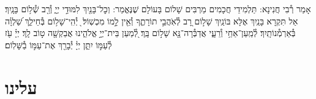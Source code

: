 \documentclass[twoside, openany, parskip=half, 11pt]{book}
\begin{document}
\vspace{-.3\baselineskip}
אָמַר רְ֯בִי חֲנִינָא: תַּלְמִידֵי חֲכָמִים מַרְבִּים שָׁלוֹם בָּעוֹלָם שֶׁנֶּאֱמַר: וְכׇל־בָּנַ֖יִךְ לִמּוּדֵ֣י יְיָ֑ וְ֯רַ֖ב שְׁ֯ל֥וֹם בָּנָֽיִךְ׃ אַל תִּקְרָא בָּנַֽיִךְ אֶלָּא בּוֹנַֽיִךְ שָׁל֣וֹם רָ֭ב לְ֯אֹֽהֲבֵ֣י תוֹרָתֶ֑ךָ וְ֯אֵ֖ין לָ֣מוֹ מִכְשֽׁוֹל׃  ֖ יְ֯הִֽי־שָׁל֥וֹם בְּ֯חֵילֵ֑ךְ שַׁ֝לְוָ֗ה בְּ֯אַרְמְ֯נוֹתָֽיִךְ׃ לְ֯מַֽעַן־אַחַ֥י וְ֯רֵעָ֑י אֲדַבְּ֯רָה־נָּ֖א שָׁל֣וֹם בָּֽךְ׃ לְ֭֯מַעַן בֵּית־יְיָ֣ אֱלֹהֵ֑ינוּ אֲבַקְשָׁ֖ה ט֣וֹב לָֽךְ׃ יְיָ֗ עֹ֖ז לְ֯עַמּ֣וֹ יִתֵּ֑ן יְיָ֓ יְ֯בָרֵ֖ךְ אֶת־עַמּ֣וֹ בַ֯שָּׁלֽוֹם׃

\rabbiskaddish

\section*{ עלינו }

\aleinu



\clearpage

\vspace{-1\baselineskip}
\end{document}
